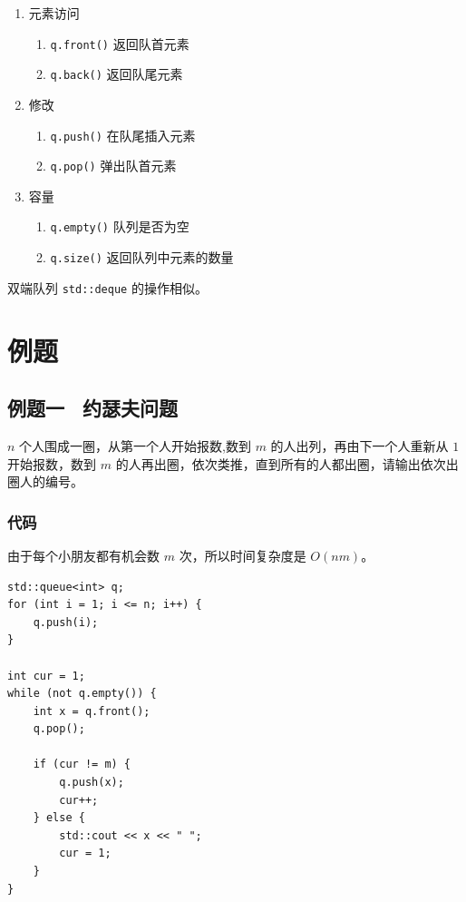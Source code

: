 \documentclass{report}
\begin{document}
\begin{enumerate}
    \item 元素访问
    \begin{enumerate}
        \item \texttt{q.front()} 返回队首元素
        \item \texttt{q.back()} 返回队尾元素
    \end{enumerate}
    \item 修改
    \begin{enumerate}
        \item \texttt{q.push()} 在队尾插入元素
        \item \texttt{q.pop()} 弹出队首元素
    \end{enumerate}
    \item 容量
    \begin{enumerate}
        \item \texttt{q.empty()} 队列是否为空
        \item \texttt{q.size()} 返回队列中元素的数量
    \end{enumerate}
\end{enumerate}

双端队列 \texttt{std::deque} 的操作相似。

\section{例题}

\subsection{例题一 \ 约瑟夫问题}

$n$ 个人围成一圈，从第一个人开始报数,数到 $m$ 的人出列，再由下一个人重新从 $1$ 开始报数，数到 $m$ 的人再出圈，依次类推，直到所有的人都出圈，请输出依次出圈人的编号。

\subsubsection{代码}

由于每个小朋友都有机会数 $m$ 次，所以时间复杂度是 $O(nm)$。

\begin{verbatim}
std::queue<int> q;
for (int i = 1; i <= n; i++) {
    q.push(i);
}

int cur = 1;
while (not q.empty()) {
    int x = q.front();
    q.pop();

    if (cur != m) {
        q.push(x);
        cur++;
    } else {
        std::cout << x << " ";
        cur = 1;
    }
}
\end{verbatim}
\end{document}
